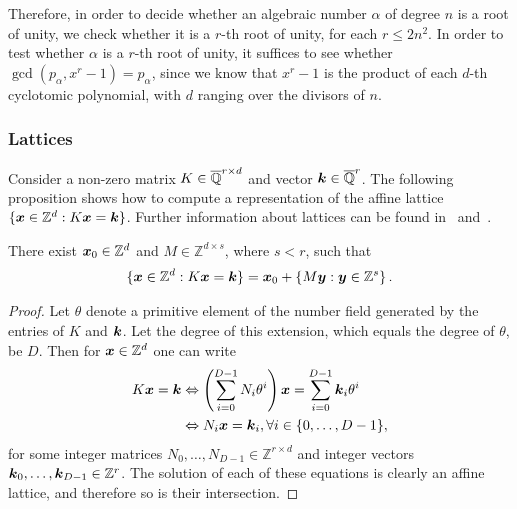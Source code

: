 Therefore, in order to decide whether an algebraic number $\alpha$ of degree $n$ is a root of unity, we check whether it is a $r$-th root of unity, for each $r\leq 2n^2$. In order to test whether $\alpha$ is a $r$-th root of unity, it suffices to see whether $\gcd(p_\alpha,x^r-1)=p_\alpha$, since we know that $x^r-1$ is the product of each $d$-th cyclotomic polynomial, with $d$ ranging over the divisors of $n$.


\subsubsection{Lattices}

Consider a non-zero matrix $K\in\overline{\mathbb{Q}}^{r\times d}$ and vector $\boldsymbol{k} \in \overline{\mathbb{Q}}^r$.  The following proposition shows how to compute a representation of the affine lattice $\{ \boldsymbol{x} \in \mathbb{Z}^d : K\boldsymbol{x} = \boldsymbol{k} \}$. Further information about lattices can be found in~\cite{LatticeBook} and~\cite{Cohen}.

\begin{proposition}
There exist $\boldsymbol{x}_{0} \in \mathbb{Z}^{d}$ and
$M \in \mathbb{Z}^{d \times s}$, where $s < r$, such that
\begin{align*}
  \{ \boldsymbol{x}\in\mathbb{Z}^d : K\boldsymbol{x} =
  \boldsymbol{k} \} =
  \boldsymbol{x}_{0} + \{ M \boldsymbol{y} : \boldsymbol{y} \in \mathbb{Z}^s \} \, .
\end{align*}
\end{proposition}

\begin{proof}
  Let $\theta$ denote a primitive element of the number field
  generated by the entries of $K$ and $\boldsymbol{k}$. Let the degree of this extension, which equals the degree of $\theta$, be $D$. Then for $\boldsymbol{x} \in \mathbb{Z}^d$ one can write
\begin{align*}
K \boldsymbol{x} = \boldsymbol{k} &\Leftrightarrow \left( \sum \limits_{i=0}^{D-1} N_{i} \theta^{i} \right) \boldsymbol{x} = \sum \limits_{i=0}^{D-1} \boldsymbol{k}_{i} \theta^{i} \\
&\Leftrightarrow N_{i} \boldsymbol{x} = \boldsymbol{k}_{i}, \forall i \in \lbrace 0, \ldots, D-1 \rbrace ,
\end{align*}
for some integer matrices $N_{0}, \ldots, N_{D-1} \in \mathbb{Z}^{r \times d}$ and integer
vectors $\boldsymbol{k}_{0}, \ldots, \boldsymbol{k}_{D-1} \in \mathbb{Z}^{r}$.
The solution of each of these equations is clearly an affine lattice, and therefore so is their intersection.
\end{proof}
